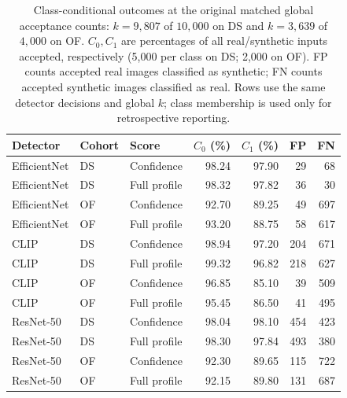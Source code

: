 \begin{table}[t]
\caption{Class-conditional outcomes at the original matched global acceptance counts: $k=9{,}807$ of $10{,}000$ on DS and $k=3{,}639$ of $4{,}000$ on OF. $C_0,C_1$ are percentages of all real/synthetic inputs accepted, respectively (5,000 per class on DS; 2,000 on OF). FP counts accepted real images classified as synthetic; FN counts accepted synthetic images classified as real. Rows use the same detector decisions and global $k$; class membership is used only for retrospective reporting.}
\label{tab:class_conditional}
\centering\small
\begin{tabular}{lllrrrr}
\toprule
Detector & Cohort & Score & $C_0$ (\%) & $C_1$ (\%) & FP & FN \\
\midrule
EfficientNet & DS & Confidence & 98.24 & 97.90 & 29 & 68 \\
EfficientNet & DS & Full profile & 98.32 & 97.82 & 36 & 30 \\
\addlinespace[2pt]
EfficientNet & OF & Confidence & 92.70 & 89.25 & 49 & 697 \\
EfficientNet & OF & Full profile & 93.20 & 88.75 & 58 & 617 \\
\addlinespace[2pt]
CLIP & DS & Confidence & 98.94 & 97.20 & 204 & 671 \\
CLIP & DS & Full profile & 99.32 & 96.82 & 218 & 627 \\
\addlinespace[2pt]
CLIP & OF & Confidence & 96.85 & 85.10 & 39 & 509 \\
CLIP & OF & Full profile & 95.45 & 86.50 & 41 & 495 \\
\addlinespace[2pt]
ResNet-50 & DS & Confidence & 98.04 & 98.10 & 454 & 423 \\
ResNet-50 & DS & Full profile & 98.30 & 97.84 & 493 & 380 \\
\addlinespace[2pt]
ResNet-50 & OF & Confidence & 92.30 & 89.65 & 115 & 722 \\
ResNet-50 & OF & Full profile & 92.15 & 89.80 & 131 & 687 \\
\bottomrule
\end{tabular}
\end{table}
